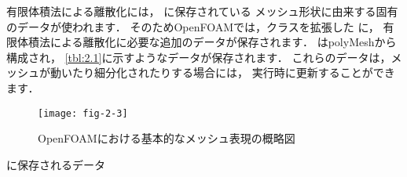 有限体積法による離散化には，
に保存されている
%  
メッシュ形状に由来する固有のデータが使われます．
そのためOpenFOAMでは，クラスを拡張した
% 
% 
に，
有限体積法による離散化に必要な追加のデータが保存されます．
は{polyMesh}から構成され，
\autoref{tbl:2.1}に示すようなデータが保存されます．
これらのデータは，メッシュが動いたり細分化されたりする場合には，
実行時に更新することができます．


\begin{figure}[ht]
 \texttt{[image: fig-2-3]}
 \caption{OpenFOAMにおける基本的なメッシュ表現の概略図}
 \label{fig:2.3}
\end{figure}


\begin{table}[ht]
 
 \caption{に保存されるデータ}
 \label{tbl:2.1}
\end{table}


